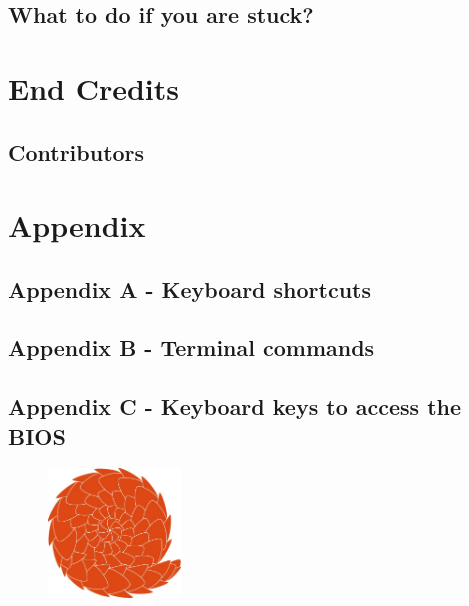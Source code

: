 \documentclass[10pt,a4paper,oneside,final,titlepage]{book}
\begin{document}
\chapter{What to do if you are stuck?}


\part{End Credits}

\chapter{Contributors}



\thispagestyle{empty}
\mbox{}
\pagestyle{fancy}
	\fancyhf{}
	\lhead{}
	\rhead{}
	\cfoot{\thepage}
	\renewcommand{\headrulewidth}{0pt}
\part{Appendix}

\chapter{Appendix A - Keyboard shortcuts}


\chapter{Appendix B - Terminal commands}


\chapter{Appendix C - Keyboard keys to access the BIOS}


\printindex

\newpage

\begin{figure}[h!]	
	\vspace{10cm}
	\centering
	\includegraphics[width=100pt]{./images/logo.jpg}
	\label{fig:logo}	
\end{figure}
\end{document}
